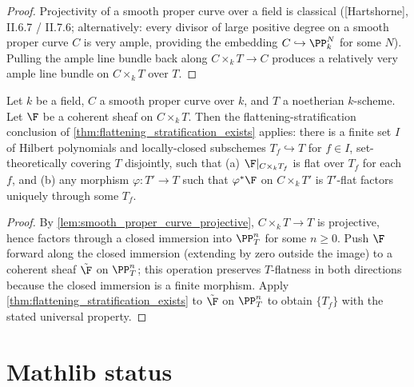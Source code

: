 \begin{proof}
  Projectivity of a smooth proper curve over a field is classical
  ([Hartshorne], II.6.7 / II.7.6; alternatively: every divisor of large
  positive degree on a smooth proper curve \(C\) is very ample, providing the
  embedding \(C \hookrightarrow \PP^N_k\) for some \(N\)). Pulling the ample line
  bundle back along \(C \times_k T \to C\) produces a relatively very ample line
  bundle on \(C \times_k T\) over \(T\).
\end{proof}

\begin{corollary}

  \label{cor:flattening_stratification_curve}
  Let \(k\) be a field, \(C\) a smooth proper curve over \(k\), and \(T\) a noetherian
  \(k\)-scheme.  Let \(\F\) be a coherent sheaf on \(C \times_k T\). Then the
  flattening-stratification conclusion of
  \cref{thm:flattening_stratification_exists} applies: there is a finite
  set \(I\) of Hilbert polynomials and locally-closed subschemes
  \(T_f \hookrightarrow T\) for \(f \in I\), set-theoretically covering \(T\)
  disjointly, such that (a) \(\F|_{C \times_k T_f}\) is flat over \(T_f\) for
  each \(f\), and (b) any morphism \(\varphi : T' \to T\) such that
  \(\varphi^* \F\) on \(C \times_k T'\) is \(T'\)-flat factors uniquely through some
  \(T_f\).
\end{corollary}

\begin{proof}
  
  By \cref{lem:smooth_proper_curve_projective}, \(C \times_k T \to T\) is
  projective, hence factors through a closed immersion into \(\PP^n_T\) for some
  \(n \ge 0\).  Push \(\F\) forward along the closed immersion (extending by zero
  outside the image) to a coherent sheaf \(\tilde \F\) on \(\PP^n_T\); this
  operation preserves \(T\)-flatness in both directions because the closed
  immersion is a finite morphism.  Apply
  \cref{thm:flattening_stratification_exists} to \(\tilde \F\) on
  \(\PP^n_T\) to obtain \(\{T_f\}\) with the stated universal property.
\end{proof}

\section{Mathlib status}
\label{sec:flatstrat_mathlib_status}

